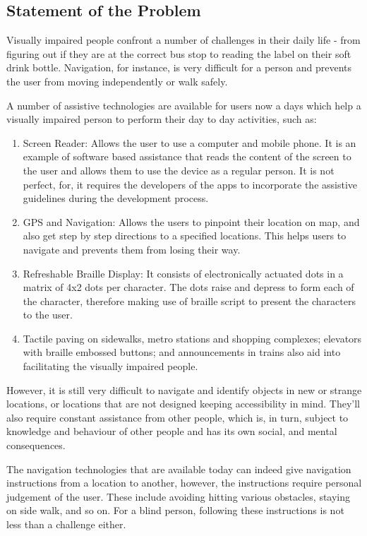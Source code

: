 \documentclass[
10pt,           %
a4paper,        %
oneside,        %
headinclude,footinclude, %
]{scrartcl}
\begin{document}
\subsection{Statement of the Problem}
Visually impaired people confront a number of challenges in their daily life - from figuring out if they are at the correct bus stop to reading the label on their soft drink bottle. Navigation, for instance, is very difficult for a person and prevents the user from moving independently or walk safely.

A number of assistive technologies are available for users now a days which help a visually impaired person to perform their day to day activities, such as:

\begin{enumerate}
	\item Screen Reader: Allows the user to use a computer and mobile phone. It is an example of software based assistance that reads the content of the screen to the user and allows them to use the device as a regular person. It is not perfect, for, it requires the developers of the apps to incorporate the assistive guidelines during the development process.
	\item GPS and Navigation: Allows the users to pinpoint their location on map, and also get step by step directions to a specified locations. This helps users to navigate and prevents them from losing their way.
	\item Refreshable Braille Display: It consists of electronically actuated dots in a matrix of 4x2 dots per character. The dots raise and depress to form each of the character, therefore making use of braille script to present the characters to the user.
	\item Tactile paving on sidewalks, metro stations and shopping complexes; elevators with braille embossed buttons; and announcements in trains also aid into facilitating the visually impaired people.
\end{enumerate}

However, it is still very difficult to navigate and identify objects in new or strange locations, or locations that are not designed keeping accessibility in mind. They’ll also require constant assistance from other people, which is, in turn, subject to knowledge and behaviour of other people and has its own social, and mental consequences.

The navigation technologies that are available today can indeed give navigation instructions from a location to another, however, the instructions require personal judgement of the user. These include avoiding hitting various obstacles, staying on side walk, and so on. For a blind person, following these instructions is not less than a challenge either.
\end{document}
